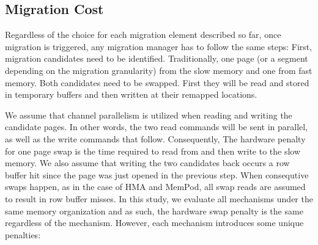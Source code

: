 \subsection{Migration Cost}
Regardless of the choice for each migration element described so far, once migration is triggered, any migration manager has to follow the same steps: First, migration candidates need to be identified. Traditionally, one page (or a segment depending on the migration granularity) from the slow memory and one from fast memory. Both candidates need to be swapped. First they will be read and stored in temporary buffers and then written at their remapped locations. 

We assume that channel parallelism is utilized when reading and writing the candidate pages. In other words, the two read commands will be sent in parallel, as well as the write commands that follow. Consequently, The hardware penalty for one page swap is the time required to read from and then write to the slow memory. We also assume that writing the two candidates back occurs a row buffer hit since the page was just opened in the previous step. When consequtive swaps happen, as in the case of HMA and MemPod, all swap reads are assumed to result in row buffer misses. In this study, we evaluate all mechanisms under the same memory organization and as such, the hardware swap penalty is the same regardless of the mechanism. However, each mechanism introduces some unique penalties:
